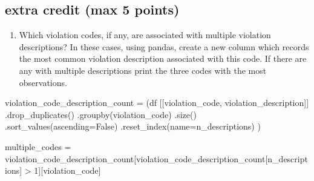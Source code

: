 \documentclass[
  letterpaper,
  DIV=11,
  numbers=noendperiod]{scrartcl}
\newenvironment{Shaded}{\begin{snugshade}}{\end{snugshade}}
\newcommand{\DecValTok}[1]{\textcolor[rgb]{0.68,0.00,0.00}{#1}}
\newcommand{\NormalTok}[1]{\textcolor[rgb]{0.00,0.23,0.31}{#1}}
\newcommand{\OperatorTok}[1]{\textcolor[rgb]{0.37,0.37,0.37}{#1}}
\newcommand{\StringTok}[1]{\textcolor[rgb]{0.13,0.47,0.30}{#1}}
\newcommand{\VariableTok}[1]{\textcolor[rgb]{0.07,0.07,0.07}{#1}}
\providecommand{\tightlist}{%
  \setlength{\itemsep}{0pt}\setlength{\parskip}{0pt}}\usepackage{longtable,booktabs,array}
\begin{document}
\subsection{extra credit (max 5
points)}\label{extra-credit-max-5-points}

\begin{enumerate}
\def\labelenumi{\arabic{enumi}.}
\tightlist
\item
  Which violation codes, if any, are associated with multiple violation
  descriptions? In these cases, using pandas, create a new column which
  records the most common violation description associated with this
  code. If there are any with multiple descriptions print the three
  codes with the most observations.
\end{enumerate}

\begin{Shaded}
\begin{Highlighting}[]
\NormalTok{violation\_code\_description\_count }\OperatorTok{=}\NormalTok{ (df}
\NormalTok{[[}\StringTok{\textquotesingle{}violation\_code\textquotesingle{}}\NormalTok{, }\StringTok{\textquotesingle{}violation\_description\textquotesingle{}}\NormalTok{]] }
\NormalTok{.drop\_duplicates()}
\NormalTok{.groupby(}\StringTok{\textquotesingle{}violation\_code\textquotesingle{}}\NormalTok{)}
\NormalTok{.size()}
\NormalTok{.sort\_values(ascending}\OperatorTok{=}\VariableTok{False}\NormalTok{)}
\NormalTok{.reset\_index(name}\OperatorTok{=}\StringTok{\textquotesingle{}n\_descriptions\textquotesingle{}}\NormalTok{)}
\NormalTok{)}

\NormalTok{multiple\_codes }\OperatorTok{=}\NormalTok{ violation\_code\_description\_count[violation\_code\_description\_count[}\StringTok{\textquotesingle{}n\_descriptions\textquotesingle{}}\NormalTok{] }\OperatorTok{\textgreater{}} \DecValTok{1}\NormalTok{][}\StringTok{\textquotesingle{}violation\_code\textquotesingle{}}\NormalTok{]}


\end{Highlighting}
\end{Shaded}
\end{document}
